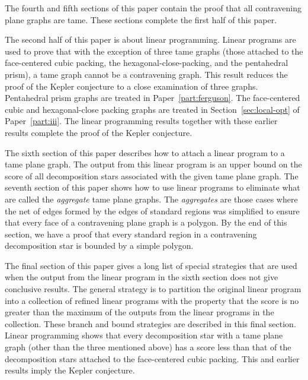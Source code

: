 The fourth and fifth sections of this paper contain the proof that
all contravening plane graphs are tame.  These sections complete the
first half of this paper.

The second half of this paper is about linear programming.  Linear
programs are used to prove that with the exception of three tame
graphs (those attached to the face-centered cubic packing, the
hexagonal-close-packing, and the pentahedral prism), a tame graph
cannot be a contravening graph.  This result reduces the proof of
the Kepler conjecture to a close examination of three graphs.
Pentahedral prism graphs are treated in Paper~\ref{part:ferguson}.
The face-centered cubic and hexagonal-close packing graphs are
treated in Section~\ref{sec:local-opt} of Paper~\ref{part:iii}. The
linear programming results together with these earlier results
complete the proof of the Kepler conjecture.

The sixth section of this paper describes how to attach a linear
program to a tame plane graph.  The output from this linear program
is an upper bound on the score of all decomposition stars associated
with the given tame plane graph. The seventh section of this paper
shows how to use linear programs to eliminate what are called the
{\it aggregate} tame plane graphs.  The {\it aggregates\/} are those
cases where the net of edges formed by the edges of standard regions
was simplified to ensure that every face of a contravening plane
graph is a polygon.  By the end of this section, we have a proof
that every standard region in a contravening decomposition star is
bounded by a simple polygon.

The final section of this paper gives a long list of special
strategies that are used when the output from the linear program in
the sixth section does not give conclusive results. The general
strategy is to partition the original linear program into a
collection of refined linear programs with the property that the
score is no greater than the maximum of the outputs from the linear
programs in the collection. These branch and bound strategies are
described in this final section.  Linear programming shows that
every decomposition star with a tame plane graph (other than the
three mentioned above) has a score less than that of the
decomposition stars attached to the face-centered cubic packing.
This and earlier results imply the Kepler conjecture.

